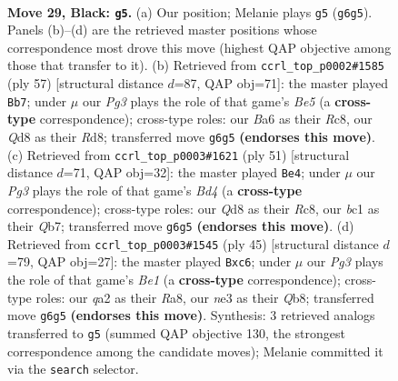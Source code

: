 \documentclass[11pt]{article}
\begin{document}
\begin{figure}[p]\centering
\begin{subfigure}{0.46\textwidth}\centering
\resizebox{\linewidth}{!}{%
\newchessgame
\chessboard[
  setfen={1r1q2k1/p1n1brn1/b5pp/P1p2p2/3p1P2/1P2N1P1/QR2P1BP/2BRN1K1 b - - 0 29},
  showmover=false,
  pgfstyle=straightmove, color=movearrow, markmove={g6-g5}
]}
\caption{}
\end{subfigure}\hfill
\begin{subfigure}{0.46\textwidth}\centering
\resizebox{\linewidth}{!}{%
\newchessgame
\chessboard[
  setfen={2rr2k1/4qpp1/1p1bpn1p/p3N3/P1B1b3/1P2P2P/1B1RQPP1/3R2K1 b - - 8 29},
  showmover=false,
  pgfstyle=straightmove, color=movearrow, markmove={e4-b7}
]}
\caption{}
\end{subfigure}
\\[4pt]
\begin{subfigure}{0.46\textwidth}\centering
\resizebox{\linewidth}{!}{%
\newchessgame
\chessboard[
  setfen={2r1k1r1/1q1n1p1p/pb2p3/3b2P1/p2B1P2/P3p3/1PP1N2P/1K1RQBR1 b - - 3 26},
  showmover=false,
  pgfstyle=straightmove, color=movearrow, markmove={d5-e4}
]}
\caption{}
\end{subfigure}\hfill
\begin{subfigure}{0.46\textwidth}\centering
\resizebox{\linewidth}{!}{%
\newchessgame
\chessboard[
  setfen={rqr1b1k1/5pp1/pbNppn1p/8/1P2PP2/R1N1B2P/2P3P1/1R2QBK1 b - - 0 23},
  showmover=false,
  pgfstyle=straightmove, color=movearrow, markmove={e8-c6}
]}
\caption{}
\end{subfigure}
\caption{\textbf{Move 29, Black: \texttt{g5}.} (a) Our position; Melanie plays \texttt{g5} (\texttt{g6g5}). Panels (b)--(d) are the retrieved master positions whose correspondence most drove this move (highest QAP objective among those that transfer to it). (b) Retrieved from \texttt{ccrl\_top\_p0002\#1585} (ply 57) [structural distance $d$=87, QAP obj=71]: the master played \texttt{Bb7}; under $\mu$ our \emph{Pg3} plays the role of that game's \emph{Be5} (a \textbf{cross-type} correspondence); cross-type roles: our \emph{B}a6 as their \emph{R}c8, our \emph{Q}d8 as their \emph{R}d8; transferred move \texttt{g6g5} \textbf{(endorses this move)}. (c) Retrieved from \texttt{ccrl\_top\_p0003\#1621} (ply 51) [structural distance $d$=71, QAP obj=32]: the master played \texttt{Be4}; under $\mu$ our \emph{Pg3} plays the role of that game's \emph{Bd4} (a \textbf{cross-type} correspondence); cross-type roles: our \emph{Q}d8 as their \emph{R}c8, our \emph{b}c1 as their \emph{Q}b7; transferred move \texttt{g6g5} \textbf{(endorses this move)}. (d) Retrieved from \texttt{ccrl\_top\_p0003\#1545} (ply 45) [structural distance $d$=79, QAP obj=27]: the master played \texttt{Bxc6}; under $\mu$ our \emph{Pg3} plays the role of that game's \emph{Be1} (a \textbf{cross-type} correspondence); cross-type roles: our \emph{q}a2 as their \emph{R}a8, our \emph{n}e3 as their \emph{Q}b8; transferred move \texttt{g6g5} \textbf{(endorses this move)}. Synthesis: 3 retrieved analogs transferred to \texttt{g5} (summed QAP objective 130, the strongest correspondence among the candidate moves); Melanie committed it via the \texttt{search} selector.}
\label{fig:thought-m57}
\end{figure}
\end{document}
